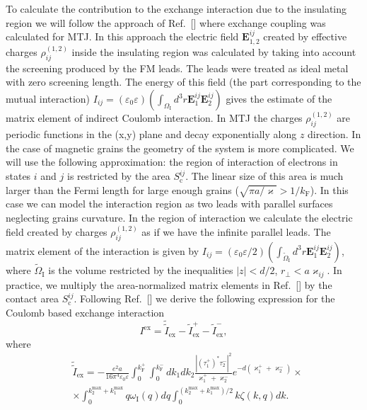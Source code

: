 \documentclass[aps,prb,amsmath,amssymb,twocolumn,superscriptaddress,showpacs,floatfix]{revtex4-1}
\begin{document}
To calculate the contribution to the exchange interaction due to the insulating
region we will follow the approach of Ref.~[] where exchange coupling
was calculated for MTJ. In this approach the electric field $\mathbf E^{ij}_{1,2}$ created by
effective charges $\rho_{ij}^{(1,2)}$ inside the insulating region was calculated by
taking into account the screening produced by the FM leads. The leads were treated as ideal metal
with zero screening length. The energy of this field (the part corresponding to the mutual interaction) $I_{ij}=(\varepsilon_0\varepsilon)(\int_{\Omega_\mathrm I} d^3r \mathbf E^{ij}_{1}\mathbf E^{ij}_{2})$ gives
the estimate of the matrix element of indirect Coulomb interaction. In MTJ the charges $\rho_{ij}^{(1,2)}$
are periodic functions in the (x,y) plane and decay exponentially along $z$ direction.
In the case of magnetic grains the geometry of the system is more complicated.
We will use the following approximation: the region of interaction of electrons
in states $i$ and $j$ is restricted by the area $S^{ij}_\mathrm c$. The linear size
of this area is much larger than the Fermi length for large enough grains
($\sqrt{\pi a/\varkappa}>1/k_\mathrm F$). In this case we can model the interaction
region as two leads with parallel surfaces neglecting grains curvature.
In the region of interaction we calculate the electric field created
by charges $\rho_{ij}^{(1,2)}$ as if we have the infinite parallel leads.
The matrix element of the interaction is given
by $I_{ij}=(\varepsilon_0\varepsilon/2)(\int_{\tilde\Omega_\mathrm I} d^3r \mathbf E^{ij}_{1}\mathbf E^{ij}_{2})$,
where $\tilde \Omega_\mathrm I$ is the volume restricted by the inequalities $|z|<d/2$, $r_\perp<a\varkappa_{ij}$.
In practice, we multiply the area-normalized matrix elements in
Ref.~[]
by the contact area $S^{ij}_\mathrm c$.
Following Ref.~[] we derive the following expression for the
Coulomb based exchange interaction
\begin{equation}\label{Eq:ExIns1}
I^\mathrm{ex}=\tilde{\tilde I}_\mathrm{ex}-\tilde I_\mathrm{ex}^+-\tilde I_\mathrm{ex}^-,
\end{equation}
where
\begin{equation}\label{Eq:ExIns2}
\begin{split}
 &\tilde{\tilde I}_\mathrm{ex}=-\frac{e^2a}{16\pi^4\varepsilon_0\varepsilon} \int_{0}^{k^+_\mathrm F}\int_{0}^{k^-_\mathrm F}\!\!\! dk_{1}dk_{2} \frac{|(\tau^+_1)^*\tau^-_2|^2}{\varkappa_1^+ +\varkappa_2^-} e^{-d(\varkappa^+_1+\varkappa^-_2)} \times \\ &\times \int_{0}^{k_2^{\mathrm{max}}+k_1^{\mathrm{max}}}q \omega_\mathrm I (q) dq \!\!\int_0^{(k_2^{\mathrm{max}}+k_1^{\mathrm{max}})/2}\!\!\! k\zeta(k,q)dk.
\end{split}
\end{equation}
\end{document}
